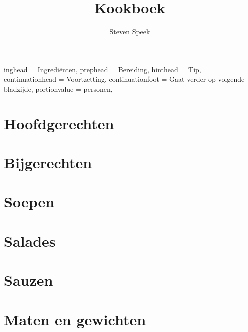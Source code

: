 \documentclass[%
a4paper,
12pt
]{book}
\begin{document}
\setHeadlines
{%
    inghead = Ingredi\"{e}nten,
    prephead = Bereiding,
    hinthead = Tip,
    continuationhead = Voortzetting,
    continuationfoot = Gaat verder op volgende bladzijde,
    portionvalue = personen,
}

\title{Kookboek}
\author{Steven Speek}

\maketitle

\tableofcontents

\chapter{Hoofdgerechten}





















\chapter{Bijgerechten}




\chapter{Soepen}



\chapter{Salades}






\chapter{Sauzen}




\appendix

\chapter{Maten en gewichten}


\end{document}

